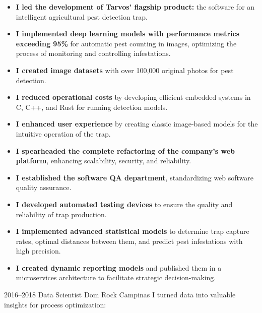 \documentclass[11pt,a4paper,sans]{moderncv}        %
\begin{document}
\begin{itemize}%
  \item \textbf{I led the development of Tarvos' flagship product:} the software for an intelligent agricultural pest detection trap.
  \item \textbf{I implemented deep learning models with performance metrics exceeding 95\%} for automatic pest counting in images, optimizing the process of monitoring and controlling infestations.
  \item \textbf{I created image datasets} with over 100,000 original photos for pest detection.
  \item \textbf{I reduced operational costs} by developing efficient embedded systems in C, C++, and Rust for running detection models.
  \item \textbf{I enhanced user experience} by creating classic image-based models for the intuitive operation of the trap.
  \item \textbf{I spearheaded the complete refactoring of the company's web platform}, enhancing scalability, security, and reliability.
  \item \textbf{I established the software QA department}, standardizing web software quality assurance.
  \item \textbf{I developed automated testing devices} to ensure the quality and reliability of trap production.
  \item \textbf{I implemented advanced statistical models} to determine trap capture rates, optimal distances between them, and predict pest infestations with high precision.
  \item \textbf{I created dynamic reporting models} and published them in a microservices architecture to facilitate strategic decision-making.

\end{itemize}

\vspace{1em}
\cventry
{2016--2018}
{Data Scientist}
{Dom Rock}
{Campinas}{}
{I turned data into valuable insights for process optimization:}
\end{document}
